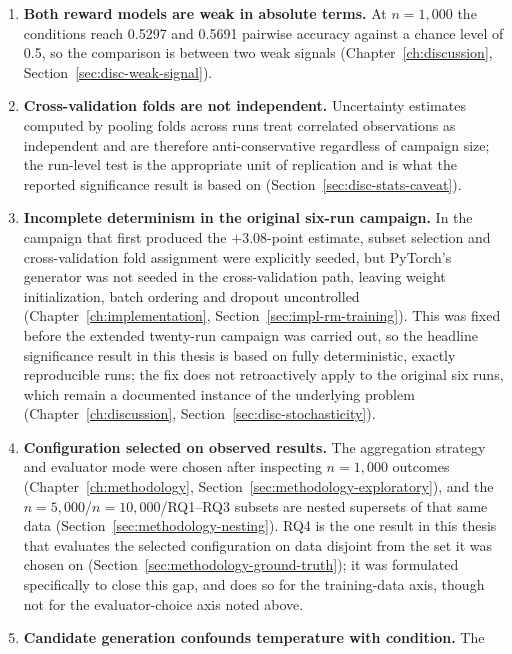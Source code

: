 \begin{enumerate}
    models trained on either preference set generate more factually consistent
    summaries.
  \item \textbf{Both reward models are weak in absolute terms.} At $n=1{,}000$
    the conditions reach 0.5297 and 0.5691 pairwise accuracy against a chance
    level of 0.5, so the comparison is between two weak signals
    (Chapter~\ref{ch:discussion}, Section~\ref{sec:disc-weak-signal}).
  \item \textbf{Cross-validation folds are not independent.} Uncertainty
    estimates computed by pooling folds across runs treat correlated
    observations as independent and are therefore anti-conservative regardless
    of campaign size; the run-level test is the appropriate unit of replication
    and is what the reported significance result is based on
    (Section~\ref{sec:disc-stats-caveat}).
  \item \textbf{Incomplete determinism in the original six-run campaign.}
    In the campaign that first produced the $+3.08$-point estimate, subset
    selection and cross-validation fold assignment were explicitly seeded, but
    PyTorch's generator was not seeded in the cross-validation path, leaving
    weight initialization, batch ordering and dropout uncontrolled
    (Chapter~\ref{ch:implementation}, Section~\ref{sec:impl-rm-training}). This
    was fixed before the extended twenty-run campaign was carried out, so the
    headline significance result in this thesis is based on fully deterministic,
    exactly reproducible runs; the fix does not retroactively apply to the
    original six runs, which remain a documented instance of the underlying
    problem (Chapter~\ref{ch:discussion}, Section~\ref{sec:disc-stochasticity}).
  \item \textbf{Configuration selected on observed results.} The aggregation
    strategy and evaluator mode were chosen after inspecting $n=1{,}000$ outcomes
    (Chapter~\ref{ch:methodology}, Section~\ref{sec:methodology-exploratory}), and
    the $n=5{,}000$/$n=10{,}000$/RQ1--RQ3 subsets are nested supersets of that
    same data (Section~\ref{sec:methodology-nesting}). RQ4 is the one result in
    this thesis that evaluates the selected configuration on data disjoint from
    the set it was chosen on (Section~\ref{sec:methodology-ground-truth}); it
    was formulated specifically to close this gap, and does so for the
    training-data axis, though not for the evaluator-choice axis noted above.
  \item \label{lim:temperature-confound}
    \textbf{Candidate generation confounds temperature with condition.} The

\end{enumerate}
